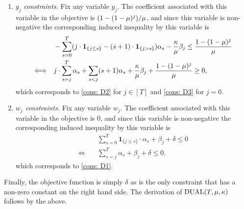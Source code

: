 \begin{enumerate}
    \item \textit{$y_j$ constraints.} Fix any variable $y_j$. The coefficient associated with this variable in the objective is $(1-(1-\mu)^{j})/\mu$, and since this variable is non-negative the corresponding induced inequality by this variable is
    \begin{align*}
        & \quad - \sum_{s=0}^T (j \cdot \bm{1}_{\{ j \leq s\}} - (s+1) \cdot \bm{1}_{\{j > s\}}) \alpha_s - \frac{\kappa}{\mu} \beta_j \leq \frac{1-(1-\mu)^{j}}{\mu}\\
        \Longleftrightarrow & \quad j \cdot \sum_{s=j}^T \alpha_s + \sum_{s < j} (s+1) \alpha_s + \frac{\kappa}{\mu} \beta_j + \frac{1-(1-\mu)^{j}}{\mu} \geq 0,
    \end{align*}
    which corresponds to \ref{cons: D2} for $j \in [T]$ and \ref{cons: D3} for $j = 0$.
    \item \textit{$w_j$ constraints.} Fix any variable $w_j$. The coefficient associated with this variable in the objective is $0$, and since this variable is non-negative the corresponding induced inequality by this variable is
    \begin{align*}
            & \quad\sum_{s=0}^T \bm{1}_{\{ j \leq s\}} \cdot \alpha_s + \beta_j + \delta \leq 0\\
            \Longleftrightarrow & \quad \sum_{s=j}^T \alpha_s + \beta_j + \delta \leq 0.
    \end{align*}
    which corresponds to \ref{cons: D1}.
\end{enumerate}
Finally, the objective function is simply $\delta$ as is the only constraint that has a non-zero constant on the right hand side. The derivation of $\mathrm{DUAL}(T, \mu, \kappa)$ follows by the above.

